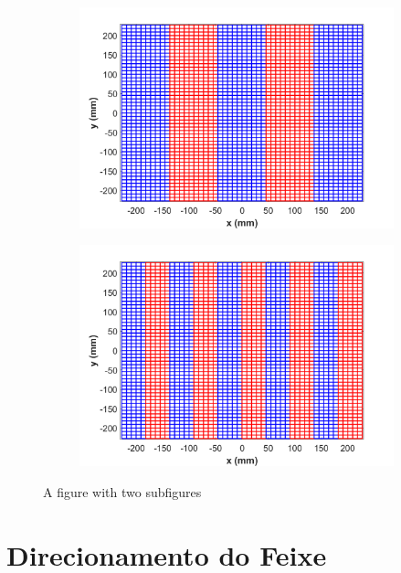 \documentclass[
	12pt,				%
	openright,			%
	oneside,			%
	a4paper,			%
	english,			%
	brazil				%
	]{abntex2}
\begin{document}
\begin{figure}
\centering
\begin{subfigure}{.5\textwidth}
  \centering
  \includegraphics[width=\textwidth]{figures/MeshDiscretization5.png}
  \label{fig:sub1}
\end{subfigure}%
\begin{subfigure}{.5\textwidth}
  \centering
  \includegraphics[width=\textwidth]{figures/MeshDiscretization10.png}
  \label{fig:sub2}
\end{subfigure}
\caption{A figure with two subfigures}
\label{fig:test}
\end{figure}

\section{Direcionamento do Feixe}
\end{document}
